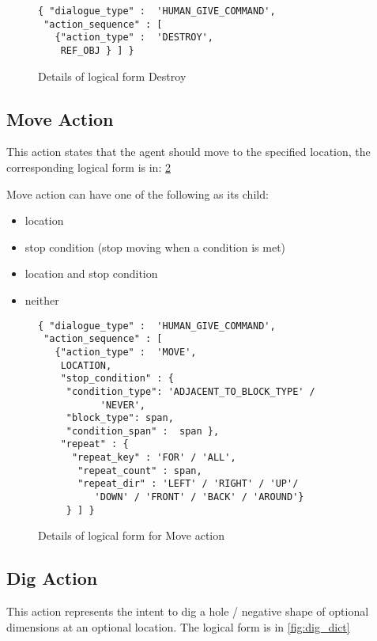 \begin{figure}[ht]
    \centering
    \fontsize{8pt}{8pt}\selectfont
    \begin{verbatim}
{ "dialogue_type" :  'HUMAN_GIVE_COMMAND',
 "action_sequence" : [
   {"action_type" :  'DESTROY',
    REF_OBJ } ] }
    \end{verbatim}
    \vspace{-20pt}
    \caption{Details of logical form  Destroy}
    \vspace{-8pt}
    \label{fig:destroy_dict}
\end{figure}



\subsection{Move Action}
This action states that the agent should move to the specified location, the corresponding logical form  is in: \ref{fig:move_dict}

Move action can have one of the following as its child:
\begin{itemize}
	\setlength\itemsep{0.0em}
	\item location
	\item stop condition (stop moving when a condition is met)
	\item location and stop condition
	\item neither
\end{itemize}


\begin{figure}[ht]
    \centering
    \fontsize{8pt}{8pt}\selectfont
    \begin{verbatim}
{ "dialogue_type" :  'HUMAN_GIVE_COMMAND',
 "action_sequence" : [
   {"action_type" :  'MOVE',
    LOCATION,
    "stop_condition" : {
     "condition_type": 'ADJACENT_TO_BLOCK_TYPE' /
           'NEVER',
     "block_type": span,
     "condition_span" :  span },
    "repeat" : {
      "repeat_key" : 'FOR' / 'ALL',
       "repeat_count" : span,
       "repeat_dir" : 'LEFT' / 'RIGHT' / 'UP'/ 
          'DOWN' / 'FRONT' / 'BACK' / 'AROUND'}
     } ] }

    \end{verbatim}
    \vspace{-20pt}
    \caption{Details of logical form  for Move action}
    \vspace{-8pt}
    \label{fig:move_dict}
\end{figure}

\subsection{ Dig Action}
This action represents the intent to dig a hole / negative shape of optional dimensions at an optional location. The logical form is in \ref{fig:dig_dict}

